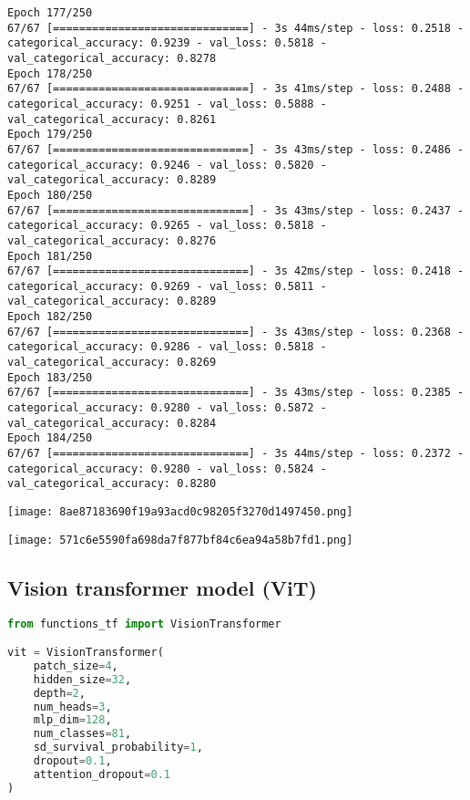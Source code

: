 \begin{lstlisting}
Epoch 177/250
67/67 [==============================] - 3s 44ms/step - loss: 0.2518 - categorical_accuracy: 0.9239 - val_loss: 0.5818 - val_categorical_accuracy: 0.8278
Epoch 178/250
67/67 [==============================] - 3s 41ms/step - loss: 0.2488 - categorical_accuracy: 0.9251 - val_loss: 0.5888 - val_categorical_accuracy: 0.8261
Epoch 179/250
67/67 [==============================] - 3s 43ms/step - loss: 0.2486 - categorical_accuracy: 0.9246 - val_loss: 0.5820 - val_categorical_accuracy: 0.8289
Epoch 180/250
67/67 [==============================] - 3s 43ms/step - loss: 0.2437 - categorical_accuracy: 0.9265 - val_loss: 0.5818 - val_categorical_accuracy: 0.8276
Epoch 181/250
67/67 [==============================] - 3s 42ms/step - loss: 0.2418 - categorical_accuracy: 0.9269 - val_loss: 0.5811 - val_categorical_accuracy: 0.8289
Epoch 182/250
67/67 [==============================] - 3s 43ms/step - loss: 0.2368 - categorical_accuracy: 0.9286 - val_loss: 0.5818 - val_categorical_accuracy: 0.8269
Epoch 183/250
67/67 [==============================] - 3s 43ms/step - loss: 0.2385 - categorical_accuracy: 0.9280 - val_loss: 0.5872 - val_categorical_accuracy: 0.8284
Epoch 184/250
67/67 [==============================] - 3s 44ms/step - loss: 0.2372 - categorical_accuracy: 0.9280 - val_loss: 0.5824 - val_categorical_accuracy: 0.8280
\end{lstlisting}

\texttt{[image: 8ae87183690f19a93acd0c98205f3270d1497450.png]}

\texttt{[image: 571c6e5590fa698da7f877bf84c6ea94a58b7fd1.png]}

\hypertarget{vision-transformer-model-vit}{%
\subsection{Vision transformer model
(ViT)}\label{vision-transformer-model-vit}}

\begin{lstlisting}[language=Python]
from functions_tf import VisionTransformer

vit = VisionTransformer(
    patch_size=4,
    hidden_size=32,
    depth=2,
    num_heads=3,
    mlp_dim=128,
    num_classes=81,
    sd_survival_probability=1,
    dropout=0.1,
    attention_dropout=0.1
)
\end{lstlisting}

